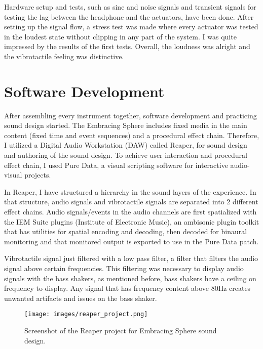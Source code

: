         Hardware setup and tests, such as sine and noise signals and transient signals for testing the lag between the headphone and the actuators, have been done. After setting up the signal flow, a stress test was made where every actuator was tested in the loudest state without clipping in any part of the system. I was quite impressed by the results of the first tests. Overall, the loudness was alright and the vibrotactile feeling was distinctive.\par

    \section{Software Development}
        After assembling every instrument together, software development and practicing sound design started. The Embracing Sphere includes fixed media in the main content (fixed time and event sequences) and a procedural effect chain. Therefore, I utilized a Digital Audio Workstation (DAW) called Reaper, for sound design and authoring of the sound design. To achieve user interaction and procedural effect chain, I used Pure Data, a visual scripting software for interactive audio-visual projects.\par

        In Reaper, I have structured a hierarchy in the sound layers of the experience. In that structure, audio signals and vibrotactile signals are separated into 2 different effect chains. Audio signals/events in the audio channels are first spatialized with the IEM Suite plugins (Institute of Electronic Music), an ambisonic plugin toolkit that has utilities for spatial encoding and decoding, then decoded for binaural monitoring and that monitored output is exported to use in the Pure Data patch.\par

        Vibrotactile signal just filtered with a low pass filter, a filter that filters the audio signal above certain frequencies. This filtering was necessary to display audio signals with the bass shakers, as mentioned before, bass shakers have a ceiling on frequency to display. Any signal that has frequency content above 80Hz creates unwanted artifacts and issues on the bass shaker.\par

        \begin{figure}[H]
            \centering
            \texttt{[image: images/reaper\_project.png]}
            \caption{Screenshot of the Reaper project for Embracing Sphere sound design.}
            \label{fig:REAPER}
        \end{figure} 

